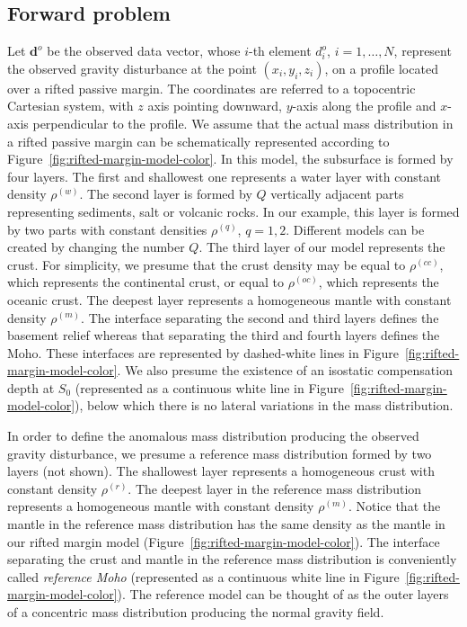 \documentclass[manuscript]{geophysics}
\begin{document}
\subsection{Forward problem}


Let $\mathbf{d}^{o}$ be the observed data vector, whose $i$-th element $d^{o}_{i}$, 
$i = 1, \dots, N$, represent the observed gravity disturbance at the point 
$(x_{i}, y_{i}, z_{i})$, on a profile located over a rifted passive margin. The
coordinates are referred to a topocentric Cartesian system, with $z$ axis pointing
downward, $y$-axis along the profile and $x$-axis perpendicular to the profile. 
We assume that the actual mass distribution in a rifted passive margin can be 
schematically represented according to Figure~\ref{fig:rifted-margin-model-color}. 
In this model, the subsurface is formed by four layers. 
The first and shallowest one represents a water layer with constant density
$\rho^{(w)}$. 
The second layer is formed by $Q$ vertically adjacent parts representing sediments,
salt or volcanic rocks.
In our example, this layer is formed by two parts with constant densities
$\rho^{(q)}$, $q = 1, 2$. Different models can be created by changing the number $Q$.
The third layer of our model represents the crust. For simplicity, we presume that the
crust density may be equal to $\rho^{(cc)}$, which
represents the continental crust, or equal to $\rho^{(oc)}$, which represents the
oceanic crust.
The deepest layer represents a homogeneous mantle with constant density $\rho^{(m)}$. 
The interface separating the second and third layers defines the basement relief whereas
that separating the third and fourth layers defines the Moho. These interfaces are
represented by dashed-white lines in Figure~\ref{fig:rifted-margin-model-color}.
We also presume the existence of an isostatic compensation depth at $S_{0}$ 
(represented as a continuous white line in Figure~\ref{fig:rifted-margin-model-color}),
below which there is no lateral variations in the mass distribution.

In order to define the anomalous mass distribution producing the observed gravity
disturbance, we presume a reference mass distribution formed by two 
layers (not shown). The shallowest layer represents a homogeneous crust with constant
density $\rho^{(r)}$.
The deepest layer in the reference mass distribution represents a homogeneous mantle
with constant density $\rho^{(m)}$. Notice that the mantle in the reference mass 
distribution has the same density as the mantle in our rifted margin model
(Figure~\ref{fig:rifted-margin-model-color}).
The interface separating the crust and mantle in the reference mass distribution 
is conveniently called \textit{reference Moho} (represented as a continuous white line
in Figure~\ref{fig:rifted-margin-model-color}).
The reference model can be thought of as the outer layers of a concentric
mass distribution producing the normal gravity field.
\end{document}
